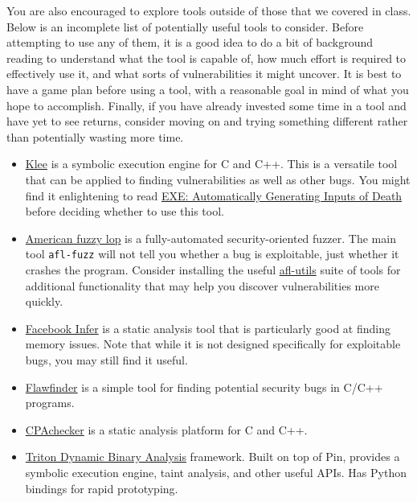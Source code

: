 \documentclass[11pt]{article}
\begin{document}
You are also encouraged to explore tools outside of those that we covered in class. Below is an incomplete list of potentially useful tools to consider. Before attempting to use any of them, it is a good idea to do a bit of background reading to understand what the tool is capable of, how much effort is required to effectively use it, and what sorts of vulnerabilities it might uncover. It is best to have a game plan before using a tool, with a reasonable goal in mind of what you hope to accomplish. Finally, if you have already invested some time in a tool and have yet to see returns, consider moving on and trying something different rather than potentially wasting more time.
\begin{itemize}

\item \href{https://klee.github.io/}{Klee} is a symbolic execution engine for C and C++. This is a versatile tool that can be applied to finding vulnerabilities as well as other bugs. You might find it enlightening to read \href{https://web.stanford.edu/~engler/exe-ccs-06.pdf}{EXE: Automatically Generating Inputs of Death} before deciding whether to use this tool.

\item \href{http://lcamtuf.coredump.cx/afl/}{American fuzzy lop} is a fully-automated security-oriented fuzzer. The main tool \verb'afl-fuzz' will not tell you whether a bug is exploitable, just whether it crashes the program. Consider installing the useful \href{https://github.com/rc0r/afl-utils}{afl-utils} suite of tools for additional functionality that may help you discover vulnerabilities more quickly.

\item \href{http://fbinfer.com/}{Facebook Infer} is a static analysis tool that is particularly good at finding memory issues. Note that while it is not designed specifically for exploitable bugs, you may still find it useful.

\item \href{https://www.dwheeler.com/flawfinder/}{Flawfinder} is a simple tool for finding potential security bugs in C/C++ programs.

\item \href{https://cpachecker.sosy-lab.org/doc.php}{CPAchecker} is a static analysis platform for C and C++.

\item \href{https://triton.quarkslab.com/}{Triton Dynamic Binary Analysis} framework. Built on top of Pin, provides a symbolic execution engine, taint analysis, and other useful APIs. Has Python bindings for rapid prototyping.


\end{itemize}
\end{document}
